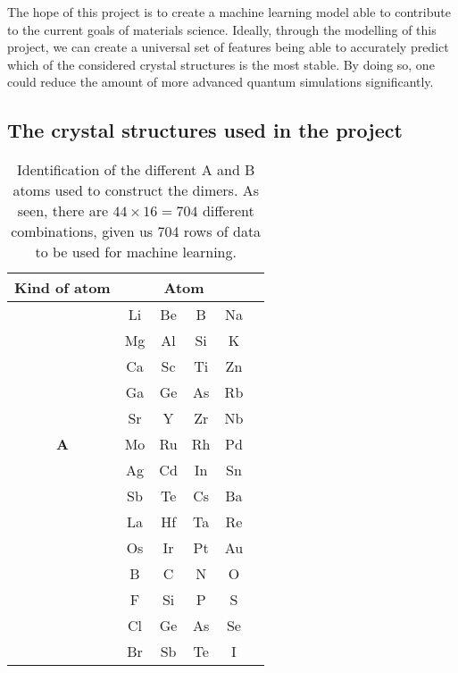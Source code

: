 The hope of this project is to create a machine learning model able to contribute to the current goals of materials science. Ideally, through the modelling of this project, we can create a universal set of features being able to accurately predict which of the considered crystal structures is the most stable. By doing so, one could reduce the amount of more advanced quantum simulations significantly. 
\subsection{The crystal structures used in the project}
\begin{table}[ht]
    \centering
    \begin{tabular}{cccccc}
    \toprule
    Kind of atom  & \multicolumn{4}{c}{Atom} \\\midrule
    \multirow{11}{*}{\textbf{A}} 
        & Li & Be & B & Na  \\
        & Mg & Al & Si & K  \\
        & Ca & Sc & Ti & Zn \\
        & Ga & Ge & As & Rb  \\ 
        & Sr & Y & Zr & Nb  \\
        & Mo & Ru & Rh & Pd  \\
        & Ag & Cd & In & Sn  \\
        & Sb & Te & Cs & Ba  \\
        & La & Hf & Ta & Re  \\
        & Os & Ir & Pt & Au  \\\midrule
    \multirow{4}{*}{\textbf{B}}    
        & B & C & N & O   \\
        & F & Si & P & S   \\
        & Cl & Ge & As & Se   \\
        & Br & Sb & Te & I   \\\bottomrule
    \end{tabular}
    \caption[The different A and B atoms used]{Identification of the different A and B atoms used to construct the dimers. As seen, there are $44 \times 16 = 704$ different combinations, given us 704 rows of data to be used for machine learning.}
    \label{tab:ABcompounds}
\end{table}


